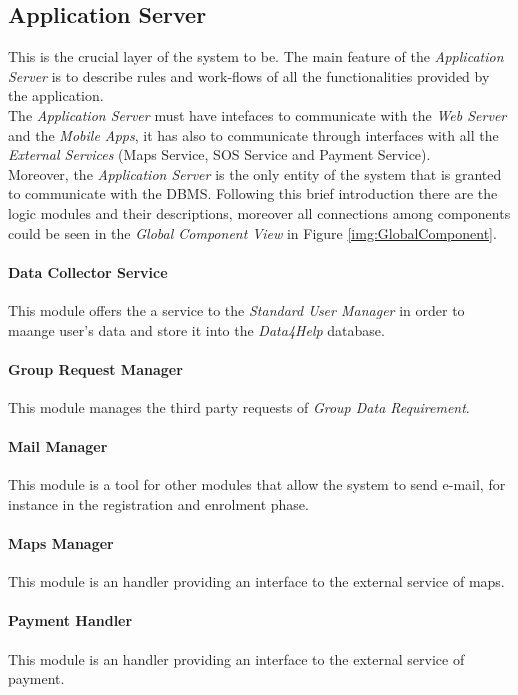 \subsection{Application Server}
This is the crucial layer of the system to be. The main feature of the \textit{Application Server} is to describe rules and work-flows of all the functionalities provided by the application.\\
The \textit{Application Server} must have intefaces to communicate with the \textit{Web Server} and the \textit{Mobile Apps}, it has also to communicate through interfaces with all the \textit{External Services} (Maps Service, SOS Service and Payment Service).\\
Moreover, the \textit{Application Server} is the only entity of the system that is granted to communicate with the DBMS.
Following this brief introduction there are the logic modules and their descriptions, moreover all connections among components could be seen in the \textit{Global Component View} in Figure \ref{img:GlobalComponent}.

\paragraph{Data Collector Service}
This module offers the a service to the \textit{Standard User Manager} in order to maange user's data and store it into the \textit{Data4Help} database.

\paragraph{Group Request Manager}
This module manages the third party requests of \textit{Group Data Requirement}.

\paragraph{Mail Manager}
This module is a tool for other modules that allow the system to send e-mail, for instance in the registration and enrolment phase.

\paragraph{Maps Manager}
This module is an handler providing an interface to the external service of maps.

\paragraph{Payment Handler}
This module is an handler providing an interface to the external service of payment.

